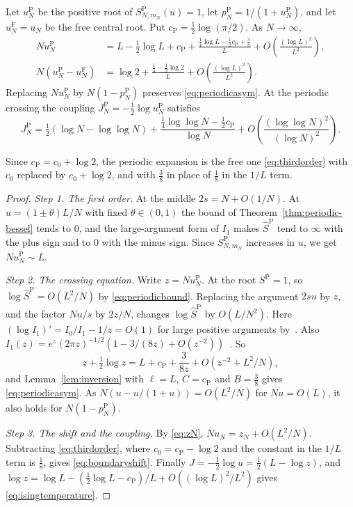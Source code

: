 \begin{theorem}\label{thm:periodic-crossing}
Let $u_N^{\mathrm P}$ be the positive root of $S^{\mathrm P}_{N,m_N}(u)=1$,
let $p_N^{\mathrm P}=1/(1+u_N^{\mathrm P})$, and let $u_N^{\mathrm F}=u_N$ be
the free central root. Put $c_{\mathrm P}=\tfrac12\log(\pi/2)$. As
$N\to\infty$,
\begin{align}
Nu_N^{\mathrm P}
 &=L-\tfrac12\log L+c_{\mathrm P}
 +\frac{\tfrac14\log L-\tfrac12c_{\mathrm P}+\tfrac38}{L}
 +O\!\left(\frac{(\log L)^2}{L^2}\right),\label{eq:periodicasym}\\
N(u_N^{\mathrm P}-u_N^{\mathrm F})
 &=\log2+\frac{\tfrac14-\tfrac12\log2}{L}
 +O\!\left(\frac{(\log L)^2}{L^2}\right).\label{eq:boundaryshift}
\end{align}
Replacing $Nu_N^{\mathrm P}$ by $N(1-p_N^{\mathrm P})$ preserves
\eqref{eq:periodicasym}. At the periodic crossing the coupling
$J_N^{\mathrm P}=-\frac12\log u_N^{\mathrm P}$ satisfies
\begin{equation}\label{eq:isingtemperature}
J_N^{\mathrm P}
=\tfrac12(\log N-\log\log N)
+\frac{\tfrac14\log\log N-\tfrac12c_{\mathrm P}}{\log N}
+O\!\left(\frac{(\log\log N)^2}{(\log N)^2}\right).
\end{equation}
\end{theorem}

Since $c_{\mathrm P}=c_0+\log2$, the periodic expansion is the free one
\eqref{eq:thirdorder} with $c_0$ replaced by $c_0+\log2$, and with $\frac38$ in
place of $\frac18$ in the $1/L$ term.

\begin{proof}
\emph{Step 1. The first order.} At the middle $2s=N+O(1/N)$. At
$u=(1\pm\theta)L/N$ with fixed $\theta\in(0,1)$ the bound of
Theorem~\ref{thm:periodic-bessel} tends to $0$, and the large-argument form of
$I_1$ makes $\widehat S^{\mathrm P}$ tend to $\infty$ with the plus sign and
to $0$ with the minus sign. Since $S^{\mathrm P}_{N,m_N}$ increases in $u$, we
get $Nu_N^{\mathrm P}\sim L$.

\emph{Step 2. The crossing equation.} Write $z=Nu_N^{\mathrm P}$. At the root
$S^{\mathrm P}=1$, so $\log\widehat S^{\mathrm P}=O(L^2/N)$ by
\eqref{eq:periodicbound}. Replacing the argument $2su$ by $z$, and the factor
$Nu/s$ by $2z/N$, changes $\log\widehat S^{\mathrm P}$ by $O(L/N^2)$.
Here $(\log I_1)'=I_0/I_1-1/z=O(1)$ for large positive arguments
by~\cite[Eqs.~10.29.2, 10.40.1]{dlmf}. Also
$I_1(z)=e^z(2\pi z)^{-1/2}(1-3/(8z)+O(z^{-2}))$~\cite[Eq.~10.40.1]{dlmf}. So
\[
z+\tfrac12\log z=L+c_{\mathrm P}+\frac3{8z}+O(z^{-2}+L^2/N),
\]
and Lemma~\ref{lem:inversion} with $\ell=L$, $C=c_{\mathrm P}$ and
$B=\frac38$ gives \eqref{eq:periodicasym}. As $N(u-u/(1+u))=O(L^2/N)$ for
$Nu=O(L)$, it also holds for $N(1-p_N^{\mathrm P})$.

\emph{Step 3. The shift and the coupling.} By \eqref{eq:zN},
$Nu_N=z_N+O(L^2/N)$. Subtracting \eqref{eq:thirdorder}, where
$c_0=c_{\mathrm P}-\log2$ and the constant in the $1/L$ term is $\frac18$, gives
\eqref{eq:boundaryshift}. Finally
$J=-\frac12\log u=\frac12(L-\log z)$, and
$\log z=\log L-(\frac12\log L-c_{\mathrm P})/L+O((\log L)^2/L^2)$ gives
\eqref{eq:isingtemperature}.
\end{proof}

